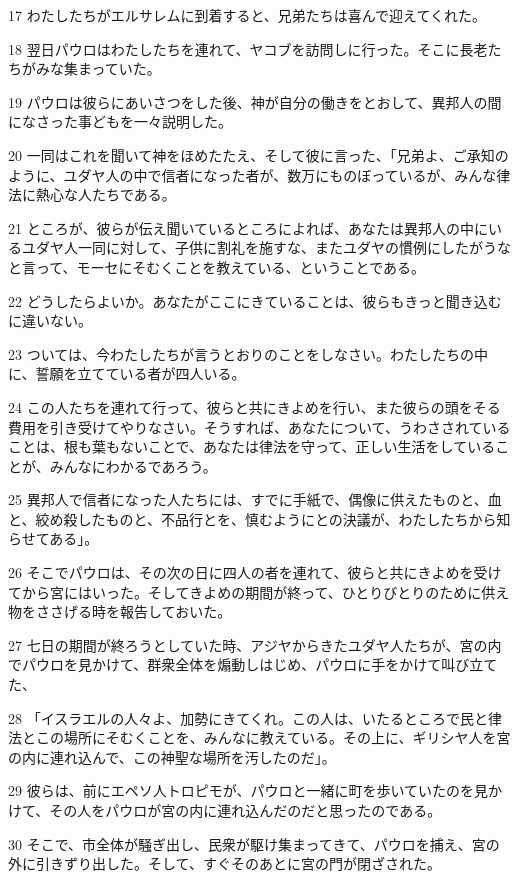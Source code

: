 \par 17 わたしたちがエルサレムに到着すると、兄弟たちは喜んで迎えてくれた。
\par 18 翌日パウロはわたしたちを連れて、ヤコブを訪問しに行った。そこに長老たちがみな集まっていた。
\par 19 パウロは彼らにあいさつをした後、神が自分の働きをとおして、異邦人の間になさった事どもを一々説明した。
\par 20 一同はこれを聞いて神をほめたたえ、そして彼に言った、「兄弟よ、ご承知のように、ユダヤ人の中で信者になった者が、数万にものぼっているが、みんな律法に熱心な人たちである。
\par 21 ところが、彼らが伝え聞いているところによれば、あなたは異邦人の中にいるユダヤ人一同に対して、子供に割礼を施すな、またユダヤの慣例にしたがうなと言って、モーセにそむくことを教えている、ということである。
\par 22 どうしたらよいか。あなたがここにきていることは、彼らもきっと聞き込むに違いない。
\par 23 ついては、今わたしたちが言うとおりのことをしなさい。わたしたちの中に、誓願を立てている者が四人いる。
\par 24 この人たちを連れて行って、彼らと共にきよめを行い、また彼らの頭をそる費用を引き受けてやりなさい。そうすれば、あなたについて、うわさされていることは、根も葉もないことで、あなたは律法を守って、正しい生活をしていることが、みんなにわかるであろう。
\par 25 異邦人で信者になった人たちには、すでに手紙で、偶像に供えたものと、血と、絞め殺したものと、不品行とを、慎むようにとの決議が、わたしたちから知らせてある」。
\par 26 そこでパウロは、その次の日に四人の者を連れて、彼らと共にきよめを受けてから宮にはいった。そしてきよめの期間が終って、ひとりびとりのために供え物をささげる時を報告しておいた。
\par 27 七日の期間が終ろうとしていた時、アジヤからきたユダヤ人たちが、宮の内でパウロを見かけて、群衆全体を煽動しはじめ、パウロに手をかけて叫び立てた、
\par 28 「イスラエルの人々よ、加勢にきてくれ。この人は、いたるところで民と律法とこの場所にそむくことを、みんなに教えている。その上に、ギリシヤ人を宮の内に連れ込んで、この神聖な場所を汚したのだ」。
\par 29 彼らは、前にエペソ人トロピモが、パウロと一緒に町を歩いていたのを見かけて、その人をパウロが宮の内に連れ込んだのだと思ったのである。
\par 30 そこで、市全体が騒ぎ出し、民衆が駆け集まってきて、パウロを捕え、宮の外に引きずり出した。そして、すぐそのあとに宮の門が閉ざされた。
